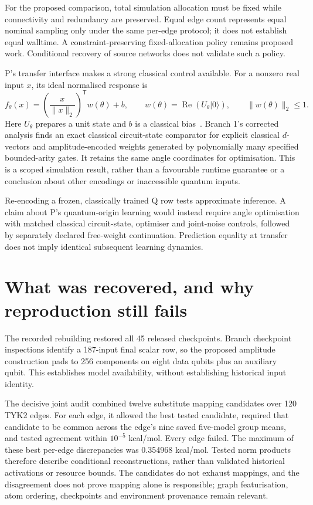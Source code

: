 \documentclass{article}
\begin{document}
For the proposed comparison, total simulation allocation must be fixed while connectivity and redundancy are preserved. Equal edge count represents equal nominal sampling only under the same per-edge protocol; it does not establish equal walltime. A constraint-preserving fixed-allocation policy remains proposed work. Conditional recovery of source networks does not validate such a policy.

P's transfer interface makes a strong classical control available. For a nonzero real input \(x\), its ideal normalised response is
\[
f_\theta(x)=\left(\frac{x}{\|x\|_2}\right)^{\mathsf T}w(\theta)+b,
\qquad w(\theta)=\operatorname{Re}(U_\theta|0\rangle),
\qquad \|w(\theta)\|_2\leq1.
\]
Here \(U_\theta\) prepares a unit state and \(b\) is a classical bias~\cite{P}. Branch 1's corrected analysis finds an exact classical circuit-state comparator for explicit classical \(d\)-vectors and amplitude-encoded weights generated by polynomially many specified bounded-arity gates. It retains the same angle coordinates for optimisation. This is a scoped simulation result, rather than a favourable runtime guarantee or a conclusion about other encodings or inaccessible quantum inputs.

Re-encoding a frozen, classically trained Q row tests approximate inference. A claim about P's quantum-origin learning would instead require angle optimisation with matched classical circuit-state, optimiser and joint-noise controls, followed by separately declared free-weight continuation. Prediction equality at transfer does not imply identical subsequent learning dynamics.

\section{What was recovered, and why reproduction still fails}

The recorded rebuilding restored all 45 released checkpoints. Branch checkpoint inspections identify a 187-input final scalar row, so the proposed amplitude construction pads to 256 components on eight data qubits plus an auxiliary qubit. This establishes model availability, without establishing historical input identity.

The decisive joint audit combined twelve substitute mapping candidates over 120 TYK2 edges. For each edge, it allowed the best tested candidate, required that candidate to be common across the edge's nine saved five-model group means, and tested agreement within \(10^{-5}\) kcal/mol. Every edge failed. The maximum of these best per-edge discrepancies was 0.354968 kcal/mol. Tested norm products therefore describe conditional reconstructions, rather than validated historical activations or resource bounds. The candidates do not exhaust mappings, and the disagreement does not prove mapping alone is responsible; graph featurisation, atom ordering, checkpoints and environment provenance remain relevant.
\end{document}
